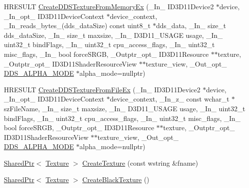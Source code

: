 \begin{DoxyCompactItemize}
\item 
H\+R\+E\+S\+U\+LT \hyperlink{namespacemage_a1325dd45fa581827025d0207029bb7f0}{Create\+D\+D\+S\+Texture\+From\+Memory\+Ex} (\+\_\+\+In\+\_\+ I\+D3\+D11\+Device2 $\ast$device, \+\_\+\+In\+\_\+opt\+\_\+ I\+D3\+D11\+Device\+Context $\ast$device\+\_\+context, \+\_\+\+In\+\_\+reads\+\_\+bytes\+\_\+(dds\+\_\+data\+Size) const uint8\+\_\+t $\ast$dds\+\_\+data, \+\_\+\+In\+\_\+ size\+\_\+t dds\+\_\+data\+Size, \+\_\+\+In\+\_\+ size\+\_\+t maxsize, \+\_\+\+In\+\_\+ D3\+D11\+\_\+\+U\+S\+A\+GE usage, \+\_\+\+In\+\_\+ uint32\+\_\+t bind\+Flags, \+\_\+\+In\+\_\+ uint32\+\_\+t cpu\+\_\+access\+\_\+flags, \+\_\+\+In\+\_\+ uint32\+\_\+t misc\+\_\+flags, \+\_\+\+In\+\_\+ bool force\+S\+R\+GB, \+\_\+\+Outptr\+\_\+opt\+\_\+ I\+D3\+D11\+Resource $\ast$$\ast$texture, \+\_\+\+Outptr\+\_\+opt\+\_\+ I\+D3\+D11\+Shader\+Resource\+View $\ast$$\ast$texture\+\_\+view, \+\_\+\+Out\+\_\+opt\+\_\+ \hyperlink{namespacemage_a0c586a2bad862f4858900ca121ca80c2}{D\+D\+S\+\_\+\+A\+L\+P\+H\+A\+\_\+\+M\+O\+DE} $\ast$alpha\+\_\+mode=nullptr)
\item 
H\+R\+E\+S\+U\+LT \hyperlink{namespacemage_ac95c9d854152c94c77105e07ab3890e0}{Create\+D\+D\+S\+Texture\+From\+File\+Ex} (\+\_\+\+In\+\_\+ I\+D3\+D11\+Device2 $\ast$device, \+\_\+\+In\+\_\+opt\+\_\+ I\+D3\+D11\+Device\+Context $\ast$device\+\_\+context, \+\_\+\+In\+\_\+z\+\_\+ const wchar\+\_\+t $\ast$sz\+File\+Name, \+\_\+\+In\+\_\+ size\+\_\+t maxsize, \+\_\+\+In\+\_\+ D3\+D11\+\_\+\+U\+S\+A\+GE usage, \+\_\+\+In\+\_\+ uint32\+\_\+t bind\+Flags, \+\_\+\+In\+\_\+ uint32\+\_\+t cpu\+\_\+access\+\_\+flags, \+\_\+\+In\+\_\+ uint32\+\_\+t misc\+\_\+flags, \+\_\+\+In\+\_\+ bool force\+S\+R\+GB, \+\_\+\+Outptr\+\_\+opt\+\_\+ I\+D3\+D11\+Resource $\ast$$\ast$texture, \+\_\+\+Outptr\+\_\+opt\+\_\+ I\+D3\+D11\+Shader\+Resource\+View $\ast$$\ast$texture\+\_\+view, \+\_\+\+Out\+\_\+opt\+\_\+ \hyperlink{namespacemage_a0c586a2bad862f4858900ca121ca80c2}{D\+D\+S\+\_\+\+A\+L\+P\+H\+A\+\_\+\+M\+O\+DE} $\ast$alpha\+\_\+mode=nullptr)
\item 
\hyperlink{namespacemage_a1e01ae66713838a7a67d30e44c67703e}{Shared\+Ptr}$<$ \hyperlink{classmage_1_1_texture}{Texture} $>$ \hyperlink{namespacemage_ac27913e621bde0fd01312183aafaaca0}{Create\+Texture} (const wstring \&fname)
\item 
\hyperlink{namespacemage_a1e01ae66713838a7a67d30e44c67703e}{Shared\+Ptr}$<$ \hyperlink{classmage_1_1_texture}{Texture} $>$ \hyperlink{namespacemage_a67c2c82133bfbce0b54db0faee82f79f}{Create\+Black\+Texture} ()
\item 

\end{DoxyCompactItemize}
